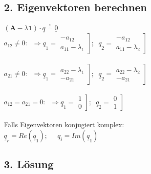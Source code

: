\documentclass[6pt,a4paper]{scrartcl}
\newcommand{\mustbe}{\stackrel{!}{=}}
\begin{document}
\begin{multicols*}{4}
\subsection*{2. Eigenvektoren berechnen}
$(\textbf{A}-\lambda \textbf{1})\cdot \underline{q}\mustbe \underline{0}$\\
$a_{12}\ne 0:\;\;\Rightarrow \underline{q}_1=\left.\begin{matrix}-a_{12} \\ a_{11}-\lambda_1\end{matrix}\right];\;\; \underline{q}_2=\left.\begin{matrix}-a_{12} \\ a_{11}-\lambda_2\end{matrix}\right]$\\\\
$a_{21}\ne 0:\;\;\Rightarrow \underline{q}_1=\left.\begin{matrix}a_{22}-\lambda_1 \\ -a_{21}\end{matrix}\right];\;\; \underline{q}_2=\left.\begin{matrix}a_{22}-\lambda_2 \\ -a_{21}\end{matrix}\right]$\\\\
$a_{12}=a_{21}= 0:\;\;\Rightarrow \underline{q}_1=\left.\begin{matrix}1 \\ 0\end{matrix}\right];\;\; \underline{q}_2=\left.\begin{matrix}0 \\ 1\end{matrix}\right]$\\\\
Falls Eigenvektoren konjugiert komplex:\\
$\underline{q}_r=Re(\underline{q}_1);\;\;\;\;\;q_i=Im(\underline{q}_1)$
\subsection*{3. Lösung}

\end{multicols*}
\end{document}
